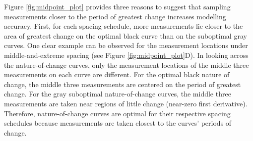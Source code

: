 \documentclass[
12pt, %
twoside,
english]{guelphthesis}
\theoremstyle{definition}
\theoremstyle{definition}
\theoremstyle{definition}
\theoremstyle{definition}
\theoremstyle{remark}
\begin{document}
Figure \ref{fig:midpoint_plot} provides three reasons to suggest that sampling measurements closer to the period of greatest change increases modelling accuracy. First, for each spacing schedule, more measurements lie closer to the area of greatest change on the optimal black curve than on the suboptimal gray curves. One clear example can be observed for the measurement locations under middle-and-extreme spacing (see Figure \ref{fig:midpoint_plot}D). In looking across the nature-of-change curves, only the measurement locations of the middle three measurements on each curve are different. For the optimal black nature of change, the middle three measurements are centered on the period of greatest change. For the gray suboptimal nature-of-change curves, the middle three measurements are taken near regions of little change (near-zero first derivative). Therefore, nature-of-change curves are optimal for their respective spacing schedules because measurements are taken closest to the curves' periods of change.
\end{document}
